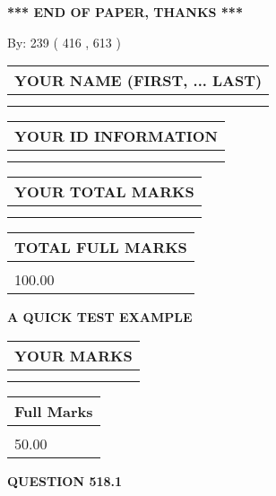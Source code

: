 \documentclass[12pt]{article}
\begin{document}
\vspace{1.0in} 
{\textbf{\large{ *** END OF PAPER, THANKS *** }}} 
   
   
\hspace{1.0in} By: 
 239 ( 416 ,  613 )
   
   
   
   
\newpage 
\setcounter{page}{ 
   518001 } 
   
   
   
   
\noindent\begin{tabular}{|l|}
\hline
YOUR NAME (FIRST, ... LAST)  \\
\hline
 \\ 
 \\ 
\hline
\end{tabular}
\hspace{0.05in} \begin{tabular}{|l|}
\hline
 YOUR   ID   INFORMATION  \\
\hline
 \\ 
 \\ 
\hline
\end{tabular}
   
   
\vspace{0.2in}\noindent\begin{tabular}{|l|}
\hline
YOUR TOTAL MARKS  \\
\hline
 \\ 
 \\ 
\hline
\end{tabular}
\hspace{0.05in} \begin{tabular}{|l|}
\hline
TOTAL FULL MARKS  \\
\hline
 \\ 
100.00 \\
\hline
\end{tabular}
   
   
 \vspace{0.2in}
{\LARGE {\textbf{ A QUICK TEST EXAMPLE}}}
   
   
  
\vspace{0.2in}
  
\noindent\begin{tabular}{|l|}
\hline
 YOUR MARKS  \\
\hline
 \\ 
 \\ 
\hline
\end{tabular}
\hspace{0.05in} \begin{tabular}{|l|}
\hline
 Full Marks  \\
\hline
 \\ 
50.00 \\
\hline
\end{tabular}
{\textbf{\Large{QUESTION
518.1 
}}}
  
\end{document}
